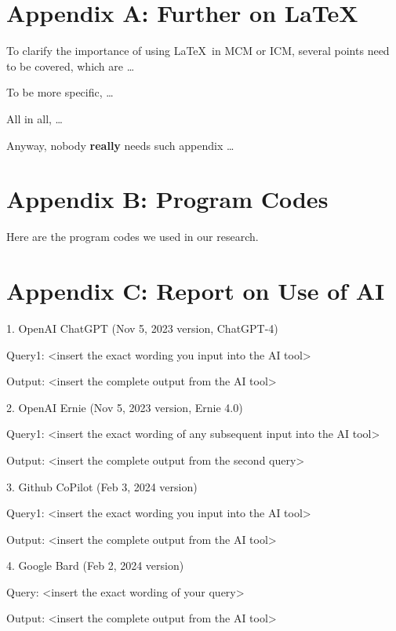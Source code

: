 \documentclass[12pt]{ctexart}
\begin{document}
\begin{subappendices}  %

	\section{Appendix A: Further on \LaTeX}
	To clarify the importance of using \LaTeX\ in MCM or ICM, several points need to be covered, which are \ldots

	To be more specific, \ldots

	All in all, \ldots

	Anyway, nobody \textbf{really} needs such appendix \ldots

	\section{Appendix B: Program Codes}
	Here are the program codes we used in our research.


	

	

	\section{Appendix C: Report on Use of AI}
	1. OpenAI ChatGPT (Nov 5, 2023 version, ChatGPT-4)

	Query1: <insert the exact wording you input into the AI tool>
	
	Output: <insert the complete output from the AI tool>

	2. OpenAI Ernie (Nov 5, 2023 version, Ernie 4.0)
	
	Query1: <insert the exact wording of any subsequent input into the AI tool>
	
	Output: <insert the complete output from the second query>
	
	3. Github CoPilot (Feb 3, 2024 version)
	
	Query1: <insert the exact wording you input into the AI tool>
	
	Output: <insert the complete output from the AI tool>
	
	4. Google Bard (Feb 2, 2024 version)
	
	Query: <insert the exact wording of your query>
	
	Output: <insert the complete output from the AI tool>
	

\end{subappendices}  %
\end{document}
